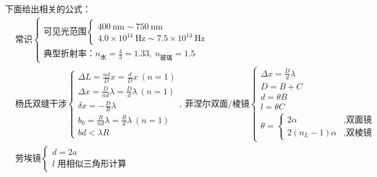 \documentclass[UTF8]{report}
\theoremstyle{MyLineTheoremStyle} %
\theoremstyle{MyBlockTheoremStyle} %
\theoremstyle{MySubsubsectionStyle} %
\begin{document}
下面给出相关的公式：
\begin{align*}
&\text{常识}
\begin{cases}
    \text{可见光范围} 
        \begin{cases}
            400 \ \mathrm{nm} \sim 750 \ \mathrm{nm} \\ 
            4.0 \times 10^{14} \ \mathrm{Hz} \sim 7.5 \times 10^{14} \ \mathrm{Hz}
        \end{cases}
    \\\text{典型折射率：} n_{\text{水}} = \frac{4}{3} = 1.33,\ n_{\text{玻璃}} = 1.5
\end{cases}
\\ &
\text{杨氏双缝干涉}
\begin{cases}
    \Delta L = \frac{nd}{D} x = \frac{d}{D} x\ (n=1)  \\ 
    \Delta x = \frac{D}{nd} \lambda = \frac{D}{d} \lambda\ (n=1) \\
    \delta x = - \frac{D}{R} \lambda \\ 
    b_0 = \frac{R}{nd}\lambda = \frac{R}{d}\lambda\ (n=1) \\ 
    bd < \lambda R
\end{cases}
,\ \text{菲涅尔双面/棱镜}
\begin{cases}
    \Delta x = \frac{D}{d}\lambda \\ 
    D = B + C \\ 
    d = \theta B \\ 
    l = \theta C \\ 
    \theta = 
    \begin{cases}
        2\alpha &, \text{双面镜} \\ 
        2(n_L-1)\alpha & , \text{双棱镜}
    \end{cases}
\end{cases}
\\ &
\text{劳埃镜}
\begin{cases}
    d = 2a \\ 
    l \text{\ 用相似三角形计算}
\end{cases}
\end{align*}
\end{document}
